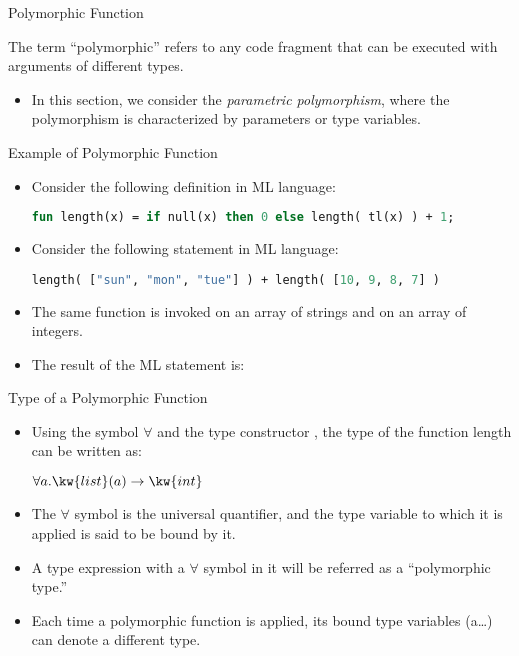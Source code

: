 \begin{bibunit}[apalike]
\begin{frame}{Polymorphic Function}
	\begin{definition}
			The term ``polymorphic'' refers to any code fragment that can be executed with arguments of different types.
	\end{definition}
	\vspace{2em}
	\begin{itemize}
	\item In this section, we consider the \emph{parametric polymorphism}, where the polymorphism is characterized by parameters or type variables.
	\end{itemize}
\end{frame}

\begin{frame}[fragile]{Example of Polymorphic Function}
	\begin{itemize}
	\item Consider the following definition in ML language:
		\begin{lstlisting}[language=ml]
		fun length(x) = if null(x) then 0 else length( tl(x) ) + 1;
		\end{lstlisting}
	\vfill
	\item Consider the following statement in ML language:
		\begin{lstlisting}[language=ml]
		length( ["sun", "mon", "tue"] ) + length( [10, 9, 8, 7] )
		\end{lstlisting}
	\vfill
	\item The same function  is invoked on an array of strings and on an array of integers.
	\vfill
	\item The result of the ML statement is: 
	\end{itemize}
\end{frame}

\begin{frame}{Type of a Polymorphic Function}
	\begin{itemize}
	\item Using the symbol $\forall$ and the type constructor , the type of the function length can be written as:
		\begin{center}
			$\forall a.\kw{list}(a) \rightarrow \kw{int}$
		\end{center}
	\vfill
	\item The $\forall$ symbol is the universal quantifier, and the type variable to which it is applied is said to be bound by it.
	\item A type expression with a $\forall$ symbol in it will be referred as a ``polymorphic type.''
	\vfill
	\item Each time a polymorphic function is applied, its bound type variables (a\dots) can denote a different type.
	\end{itemize}
\end{frame}


\end{bibunit}
